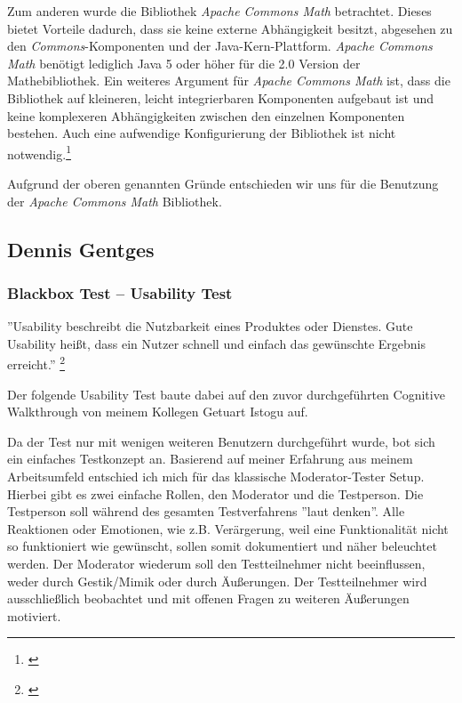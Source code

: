 Zum anderen wurde die Bibliothek \textit{Apache Commons Math} betrachtet. Dieses bietet Vorteile dadurch, dass sie keine externe Abhängigkeit besitzt, abgesehen zu den \textit{Commons}-Komponenten und der Java-Kern-Plattform. \textit{Apache Commons Math} benötigt lediglich Java 5 oder höher für die 2.0 Version der Mathebibliothek. Ein weiteres Argument für \textit{Apache Commons Math} ist, dass die Bibliothek auf kleineren, leicht integrierbaren Komponenten aufgebaut ist und keine komplexeren Abhängigkeiten zwischen den einzelnen Komponenten bestehen. Auch eine aufwendige Konfigurierung der Bibliothek ist nicht notwendig.\footnote{\cite[vgl.][]{Apache2016}}

Aufgrund der oberen genannten Gründe entschieden wir uns für die Benutzung der \textit{Apache Commons Math} Bibliothek.

\clearpage

\subsection{Dennis Gentges}

\subsubsection{Blackbox Test – Usability Test}

''Usability beschreibt die Nutzbarkeit eines Produktes oder Dienstes. Gute Usability heißt, dass ein Nutzer schnell und einfach das gewünschte Ergebnis erreicht.'' \footnote{\cite[][]{msodigital}} 

Der folgende Usability Test baute dabei auf den zuvor durchgeführten Cognitive Walkthrough von meinem Kollegen Getuart Istogu auf.

Da der Test nur mit wenigen weiteren Benutzern durchgeführt wurde, bot sich ein einfaches Testkonzept an. Basierend auf meiner Erfahrung aus meinem Arbeitsumfeld entschied ich mich für das klassische Moderator-Tester Setup. Hierbei gibt es zwei einfache Rollen, den Moderator und die Testperson. Die Testperson soll während des gesamten Testverfahrens ''laut denken''. Alle Reaktionen oder Emotionen, wie z.B. Verärgerung, weil eine Funktionalität nicht so funktioniert wie gewünscht, sollen somit dokumentiert und näher beleuchtet werden. Der Moderator wiederum soll den Testteilnehmer nicht beeinflussen, weder durch Gestik/Mimik oder durch Äußerungen. Der Testteilnehmer wird ausschließlich beobachtet und mit offenen Fragen zu weiteren Äußerungen motiviert. 

